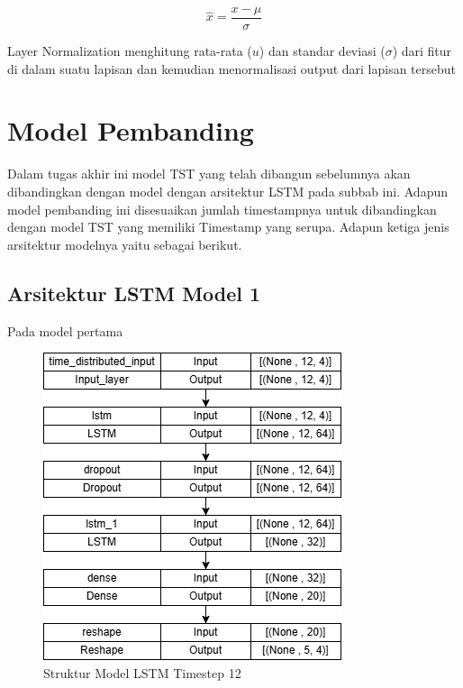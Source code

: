 \begin{equation}
    \hat{x} = \frac{x - \mu}{\sigma}
\end{equation}

Layer Normalization menghitung rata-rata (\( u \)) dan standar deviasi ($\sigma$) dari fitur di dalam suatu lapisan dan kemudian menormalisasi output dari lapisan tersebut

\section{Model Pembanding}
Dalam tugas akhir ini model TST yang telah dibangun sebelumnya akan dibandingkan dengan model dengan arsitektur LSTM pada subbab ini. Adapun model pembanding ini disesuaikan jumlah timestampnya untuk dibandingkan dengan model TST yang memiliki Timestamp yang serupa. Adapun ketiga jenis arsitektur modelnya yaitu sebagai berikut.

\subsection{Arsitektur LSTM Model 1}
Pada model pertama

\begin{figure} [H] \centering
    \includegraphics[scale=0.8]{gambar/lstmmodel1.png} 
    \caption{Struktur Model LSTM Timestep 12}
    \label{fig:lstm1}
\end{figure}




